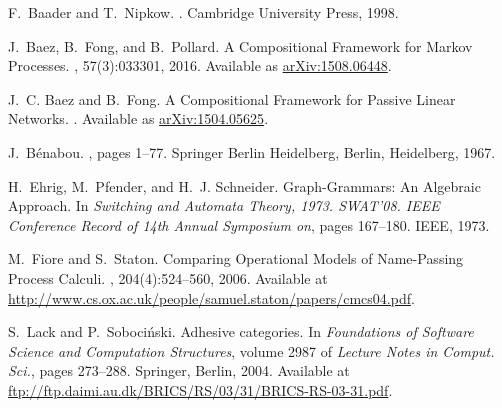 \documentclass[11pt]{amsart}
\theoremstyle{remark}
\theoremstyle{definition}
\begin{document}
%
%

%
\begin{thebibliography}{10}
	
	F.~Baader and T.~Nipkow.
	.
	\newblock Cambridge University Press, 1998.
	
	J.~Baez, B.~Fong, and B.~Pollard.
	\newblock A {C}ompositional {F}ramework for {M}arkov {P}rocesses.
	, 57(3):033301, 2016.
	\newblock Available as
	\href{https://arxiv.org/abs/1508.06448}{arXiv:1508.06448}.
	
	J.~C. Baez and B.~Fong.
	\newblock A {C}ompositional {F}ramework for {P}assive {L}inear {N}etworks.
	.
	\newblock Available as
	\href{https://arxiv.org/abs/1504.05625}{arXiv:1504.05625}.
	
	J.~B{\'e}nabou.
	, pages 1--77.
	\newblock Springer Berlin Heidelberg, Berlin, Heidelberg, 1967.
	
	H.~Ehrig, M.~Pfender, and H.~J. Schneider.
	\newblock Graph-{G}rammars: An {A}lgebraic {A}pproach.
	\newblock In {\em Switching and Automata Theory, 1973. SWAT'08. IEEE Conference
		Record of 14th Annual Symposium on}, pages 167--180. IEEE, 1973.
	
	M.~Fiore and S.~Staton.
	\newblock Comparing {O}perational {M}odels of {N}ame-{P}assing {P}rocess
	{C}alculi.
	, 204(4):524--560, 2006.
	\newblock Available at
	\href{http://www.cs.ox.ac.uk/people/samuel.staton/papers/cmcs04.pdf}{http://www.cs.ox.ac.uk/people/samuel.staton/papers/cmcs04.pdf}.
	
	S.~Lack and P.~Soboci{\'n}ski.
	\newblock Adhesive categories.
	\newblock In {\em Foundations of {S}oftware {S}cience and {C}omputation
		{S}tructures}, volume 2987 of {\em Lecture Notes in Comput. Sci.}, pages
	273--288. Springer, Berlin, 2004.
	\newblock Available at
	\href{ftp://ftp.daimi.au.dk/BRICS/RS/03/31/BRICS-RS-03-31.pdf}{ftp://ftp.daimi.au.dk/BRICS/RS/03/31/BRICS-RS-03-31.pdf}.
	

\end{thebibliography}
\end{document}
